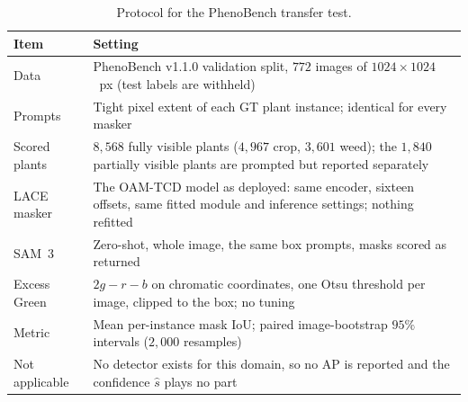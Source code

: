 \documentclass[remotesensing,article,submit,moreauthors]{Definitions/mdpi}
\begin{document}
\begin{table}[H]
\caption{Protocol for the PhenoBench transfer test. \label{tab:phenobench-protocol}}
\begin{tabularx}{\textwidth}{lX}
\toprule
\textbf{Item} & \textbf{Setting} \\
\midrule
Data & PhenoBench v1.1.0 validation split, $772$ images of $1024 \times 1024$~px (test labels are withheld) \\
Prompts & Tight pixel extent of each GT plant instance; identical for every masker \\
Scored plants & $8{,}568$ fully visible plants ($4{,}967$ crop, $3{,}601$ weed); the $1{,}840$ partially visible plants are prompted but reported separately \\
LACE masker & The OAM-TCD model as deployed: same encoder, sixteen offsets, same fitted module and inference settings; nothing refitted \\
SAM~3 & Zero-shot, whole image, the same box prompts, masks scored as returned \\
Excess Green & $2g - r - b$ on chromatic coordinates, one Otsu threshold per image, clipped to the box; no tuning \\
Metric & Mean per-instance mask IoU; paired image-bootstrap $95\%$ intervals ($2{,}000$ resamples) \\
Not applicable & No detector exists for this domain, so no AP is reported and the confidence $\hat s$ plays no part \\
\bottomrule
\end{tabularx}
\end{table}
\end{document}
